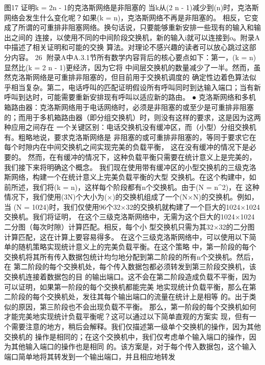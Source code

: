 图17 证明k = 2n - 1的克洛斯网络是非阻塞的
当k从(2 n - 1)减少到(n)时，克洛斯网络会发生什么变化呢？如果(k = n)，克洛斯网络不再是非阻塞的。
相反，它变成了所谓的可重排非阻塞网络。换句话说，只要能够重新安排一些现有的输入和输出之间的
连接，以使用不同的中间阶段交换机，新的输入i就可以连接到o。附录A中描述了相关证明和可能的交换
算法。对理论不感兴趣的读者可以放心跳过这部分内容。
                                                              26
附录A中A.3.1节所有数学内容背后的核心要点如下：第一，(k = n)显然比(k = 2 n - 1)更经济，因为它将
中间层交换机的数量减少了一半。然而，虽然克洛斯网络是可重排非阻塞的，但目前用于交换机调度的
确定性边着色算法似乎相当复杂。第二，电话呼叫的匹配证明假设所有呼叫同时到达输入端口；当有新
呼叫到达时，可能需要重新安排现有呼叫以适应新的路由。
  ● 克洛斯网络和多机箱路由器：克洛斯网络用于电话网络时，必须是非阻塞的或至少是可重排非阻塞
    的；而用于多机箱路由器（即分组交换机）时，则没有这样的要求，这是因为这两种应用之间存在
    一个关键区别：电话交换机没有缓冲区，而（小型）分组交换机有。粗略地说，要求克洛斯网络是
    非阻塞的或可重排非阻塞的，等同于要求它在每个时隙内在中间交换机之间实现完美的负载平衡，
    这在没有缓冲的情况下是必要的。
然而，在有缓冲的情况下，这种负载平衡只需要在统计意义上是完美的，我们接下来将明确这个概念。
我们现在使用带有缓冲区的小型交换机的三级克洛斯网络，构建一个在统计意义上完美负载平衡的大型
交换机。在这个构建中，如前所述，我们将(k = n)，这样每个阶段都有n个交换机。由于(N = n^{2})，在
这种情况下，我们使用(3N)个大小为(×)的交换机组成了一个(N×N)的交换机。例如，当
(N = 1024)时，我们仅使用96个32×32的交换机就构建了一个巨大的1024×1024交换机。我们将证明，
在这个三级克洛斯网络中，无需为这个巨大的1024×1024二分图（每次时隙）计算匹配。相反，每个小
型交换机只需为其32×32的二分图计算匹配，这在计算上要容易得多。
在这个三级克洛斯网络中，可以使用以下简单的随机策略实现统计意义上的完美负载平衡。在这个策略
中，第一阶段的每个交换机将其所有传入数据包统计均匀地分配到第二阶段的所有n个交换机。然后，在
第二阶段的每个交换机处，每个传入数据包都必须转发到第三阶段交换机，该交换机连接着数据包的目
的输出端口。这不会在第二阶段造成负载不平衡，因为可以证明，如果第一阶段的每个交换机都能完美
地实现统计负载平衡，那么在第二阶段的每个交换机处，发往其每个输出端口的流量在统计上是相等
的。出于类似的原因，第三阶段也不会出现负载不平衡。
那么，第一阶段的每个交换机如何才能完美地实现统计负载平衡呢？这可以通过以下简单直观的方案实
现，但有一个需要注意的地方，稍后会解释。我们仅描述第一级单个交换机的操作，因为其他交换机的
操作是相同的；在这个交换机中，我们仅考虑单个输入端口的操作，因为其他输入端口的操作也是相同
的。该方案是，对于每个传入数据包，这个输入端口简单地将其转发到一个输出端口，并且相应地转发
